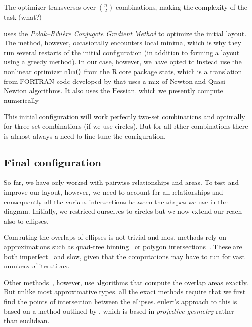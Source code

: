 \documentclass[a4paper,nofonts,nobib,titlepage,justified,marginals=raggedouter,nohyper]{tufte-handout}\usepackage[]{graphicx}\usepackage[]{color}
\newcommand{\pkg}[1]{{\fontseries{b}\selectfont #1}}
\newcommand{\code}[1]{\texttt{#1}}
\begin{document}
The optimizer transverses over $\binom{n}{2}$ combinations, making the
complexity of the task (what?)

\citet{frederickson_2016} uses the \emph{Polak--Ribière Conjugate Gradient Method} to optimize
the initial layout. The method, however, occasionally encounters local minima,
which is why they run several restarts of the initial
configuration (in addition to forming a layout using a greedy method). In our
case, however, we have opted to instead use the
nonlinear optimizer \code{nlm()} from the \pkg{R} core package \pkg{stats}, which is a
translation from FORTRAN code developed by \citet{schnabel_1985} that uses a mix
of Newton and Quasi-Newton algorithms. It also uses the Hessian, which we
presently compute numerically.

This initial configuration will work perfectly two-set combinations
and optimally for three-set combinations (if we use circles). But for all other
combinations there is almost always a need to fine tune the configuration.

\subsection{Final configuration}
\label{sec:finalConfig}

So far, we have only worked with pairwise relationships and areas. To
test and improve our layout, however, we need to account for all
relationships and consequently all the various intersections between the
shapes we use in the diagram. Initially, we restriced ourselves to circles but
we now extend our reach also to ellipses.

Computing the overlaps of ellipses is not trivial and most methods rely on
approximations such as quad-tree
binning~\citep{wilkinson_2012} or polygon intersections~\citep{kestler_2008}. These
are both imperfect~\citep{micallef_2013} and slow, given that the
computations may have to run for vast numbers of iterations.

Other methods~\citep{micallef_2013,frederickson_2016}, however, use algorithms
that compute the overlap areas exactly. But unlike most approximative
types, all the exact methods require that we first find the points
of intersection between the ellipses. \pkg{eulerr}'s approach to this is based
on a method outlined by \citet{richter-gebert_2011}, which is based in
\emph{projective geometry} rather than euclidean.
\end{document}
